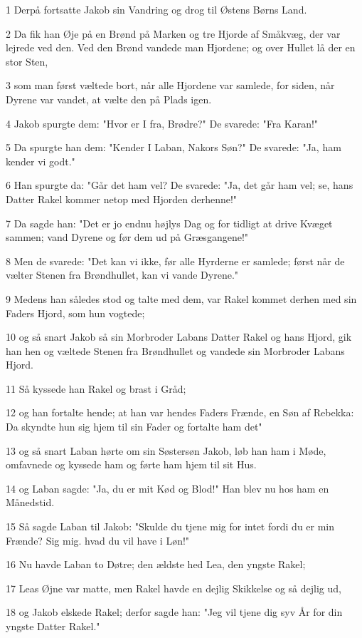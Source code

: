 \par 1 Derpå fortsatte Jakob sin Vandring og drog til Østens Børns Land.
\par 2 Da fik han Øje på en Brønd på Marken og tre Hjorde af Småkvæg, der var lejrede ved den. Ved den Brønd vandede man Hjordene; og over Hullet lå der en stor Sten,
\par 3 som man først væltede bort, når alle Hjordene var samlede, for siden, når Dyrene var vandet, at vælte den på Plads igen.
\par 4 Jakob spurgte dem: "Hvor er I fra, Brødre?" De svarede: "Fra Karan!"
\par 5 Da spurgte han dem: "Kender I Laban, Nakors Søn?" De svarede: "Ja, ham kender vi godt."
\par 6 Han spurgte da: "Går det ham vel? De svarede: "Ja, det går ham vel; se, hans Datter Rakel kommer netop med Hjorden derhenne!"
\par 7 Da sagde han: "Det er jo endnu højlys Dag og for tidligt at drive Kvæget sammen; vand Dyrene og før dem ud på Græsgangene!"
\par 8 Men de svarede: "Det kan vi ikke, før alle Hyrderne er samlede; først når de vælter Stenen fra Brøndhullet, kan vi vande Dyrene."
\par 9 Medens han således stod og talte med dem, var Rakel kommet derhen med sin Faders Hjord, som hun vogtede;
\par 10 og så snart Jakob så sin Morbroder Labans Datter Rakel og hans Hjord, gik han hen og væltede Stenen fra Brøndhullet og vandede sin Morbroder Labans Hjord.
\par 11 Så kyssede han Rakel og brast i Gråd;
\par 12 og han fortalte hende; at han var hendes Faders Frænde, en Søn af Rebekka: Da skyndte hun sig hjem til sin Fader og fortalte ham det"
\par 13 og så snart Laban hørte om sin Søstersøn Jakob, løb han ham i Møde, omfavnede og kyssede ham og førte ham hjem til sit Hus.
\par 14 og Laban sagde: "Ja, du er mit Kød og Blod!" Han blev nu hos ham en Månedstid.
\par 15 Så sagde Laban til Jakob: "Skulde du tjene mig for intet fordi du er min Frænde? Sig mig. hvad du vil have i Løn!"
\par 16 Nu havde Laban to Døtre; den ældste hed Lea, den yngste Rakel;
\par 17 Leas Øjne var matte, men Rakel havde en dejlig Skikkelse og så dejlig ud,
\par 18 og Jakob elskede Rakel; derfor sagde han: "Jeg vil tjene dig syv År for din yngste Datter Rakel."
